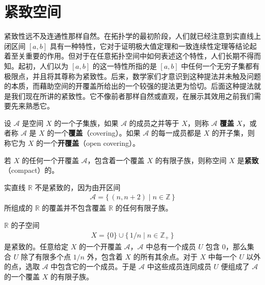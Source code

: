 \section{紧致空间}\label{section:ch03-compact-spaces}

紧致性远不及连通性那样自然。在拓扑学的最初阶段，人们就已经注意到实直线上闭区间 $[a,b]$ 具有一种特性，它对于证明极大值定理和一致连续性定理等结论起着至关重要的作用。但对于在任意拓扑空间中如何表述这个特性，人们长期不得而知。起初，人们以为 $[a,b]$ 的这一特性所指的是 $[a,b]$ 中任何一个无穷子集都有极限点，并且将其尊称为紧致性。后来，数学家们才意识到这种提法并未触及问题的本质，而藉助空间的开覆盖所给出的一个较强的提法更为恰切。后面这种提法就是我们现在所讲的紧致性。它不像前者那样自然或直观，在展示其效用之前我们需要先来熟悉它。

\begin{definition}\label{definition:ch03-covering}
设 $\mathcal{A}$ 是空间 $X$ 的一个子集族，如果 $\mathcal{A}$ 的成员之并等于 $X$，则称 $\mathcal{A}$ \textbf{覆盖} $X$，或者称 $\mathcal{A}$ 是 $X$ 的一个\textbf{覆盖}（covering）。如果 $\mathcal{A}$ 的每一成员都是 $X$ 的开子集，则称它为 $X$ 的一个\textbf{开覆盖}（open covering）。
\end{definition}

\begin{definition}\label{definition:ch03-compact}
若 $X$ 的任何一个开覆盖 $\mathcal{A}$，包含着一个覆盖 $X$ 的有限子族，则称空间 $X$ 是\textbf{紧致}（compact）的。
\end{definition}

\begin{example}\label{example:ch03-real-not-compact}
实直线 $\mathbb{R}$ 不是紧致的，因为由开区间
\begin{align*}
\mathcal{A}=\{\,(n,n+2)\mid n\in\mathbb{Z}\,\}
\end{align*}
所组成的 $\mathbb{R}$ 的覆盖并不包含覆盖 $\mathbb{R}$ 的任何有限子族。
\end{example}

\begin{example}\label{example:ch03-convergent-seq-compact}
$\mathbb{R}$ 的子空间
\begin{align*}
X=\{0\}\cup\{\,1/n\mid n\in\mathbb{Z}_{+}\,\}
\end{align*}
是紧致的。任意给定 $X$ 的一个开覆盖 $\mathcal{A}$，$\mathcal{A}$ 中总有一个成员 $U$ 包含 $0$，那么集合 $U$ 除了有限多个点 $1/n$ 外，包含着 $X$ 的所有其余点。对于 $X$ 中每一个 $U$ 以外的点，选取 $\mathcal{A}$ 中包含它的一个成员。于是 $\mathcal{A}$ 中这些成员连同成员 $U$ 便组成了 $\mathcal{A}$ 的一个覆盖 $X$ 的有限子族。
\end{example}

